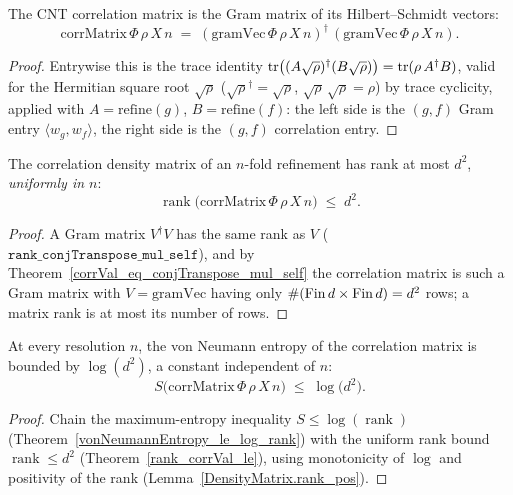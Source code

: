 \begin{theorem}\label{corrVal_eq_conjTranspose_mul_self}
  \leanok
  The CNT correlation matrix is the Gram matrix of its Hilbert--Schmidt vectors:
  \[
    \mathrm{corrMatrix}\,\Phi\,\rho\,X\,n
      \;=\; (\mathrm{gramVec}\,\Phi\,\rho\,X\,n)^{\dagger}\,(\mathrm{gramVec}\,\Phi\,\rho\,X\,n).
  \]
\end{theorem}
\begin{proof}\leanok
  Entrywise this is the trace identity \(\operatorname{tr}\bigl((A\sqrt\rho)^{\dagger}(B\sqrt\rho)\bigr)
  = \operatorname{tr}(\rho\,A^{\dagger}B)\), valid for the Hermitian square root \(\sqrt\rho\)
  (\(\sqrt\rho^{\dagger} = \sqrt\rho\), \(\sqrt\rho\,\sqrt\rho = \rho\)) by trace cyclicity, applied
  with \(A = \mathrm{refine}(g)\), \(B = \mathrm{refine}(f)\): the left side is the \((g,f)\) Gram
  entry \(\langle w_g, w_f\rangle\), the right side is the \((g,f)\) correlation entry.
\end{proof}

\begin{theorem}\label{rank_corrVal_le}
  \leanok
  The correlation density matrix of an \(n\)-fold refinement has rank at most \(d^{2}\),
  \emph{uniformly in \(n\)}:
  \[
    \operatorname{rank}\bigl(\mathrm{corrMatrix}\,\Phi\,\rho\,X\,n\bigr) \;\le\; d^{2}.
  \]
\end{theorem}
\begin{proof}\leanok
  A Gram matrix \(V^{\dagger}V\) has the same rank as \(V\)
  (\(\texttt{rank\_conjTranspose\_mul\_self}\)), and by
  Theorem~\ref{corrVal_eq_conjTranspose_mul_self} the correlation matrix is such a Gram matrix with
  \(V = \mathrm{gramVec}\) having only \(\#(\operatorname{Fin} d\times\operatorname{Fin} d) = d^{2}\) rows; a matrix rank is at
  most its number of rows.
\end{proof}

\begin{theorem}\label{vonNeumannEntropy_corrMatrix_le_log}
  \leanok
  At every resolution \(n\), the von Neumann entropy of the correlation matrix is bounded by
  \(\log(d^{2})\), a constant independent of \(n\):
  \[
    S\bigl(\mathrm{corrMatrix}\,\Phi\,\rho\,X\,n\bigr) \;\le\; \log\bigl(d^{2}\bigr).
  \]
\end{theorem}
\begin{proof}\leanok
  Chain the maximum-entropy inequality \(S\le\log(\operatorname{rank})\)
  (Theorem~\ref{vonNeumannEntropy_le_log_rank}) with the uniform rank bound
  \(\operatorname{rank}\le d^{2}\) (Theorem~\ref{rank_corrVal_le}), using monotonicity of \(\log\)
  and positivity of the rank (Lemma~\ref{DensityMatrix.rank_pos}).
\end{proof}

